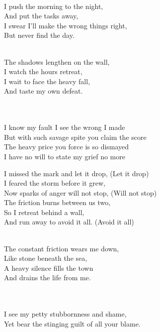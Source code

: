 \begin{lyrics}

\\
I push the morning to the night,\\
And put the tasks away,\\
I swear I’ll make the wrong things right,\\
But never find the day.

\\
The shadows lengthen on the wall,\\
I watch the hours retreat,\\
I wait to face the heavy fall,\\
And taste my own defeat.


\\
\\
I know my fault I see the wrong I made\\
But with such savage spite you claim the score\\
The heavy price you force is so dismayed\\
I have no will to state my grief no more

I missed the mark and let it drop, (Let it drop)\\
I feared the storm before it grew,\\
Now sparks of anger will not stop, (Will not stop)\\
The friction burns between us two,\\
So I retreat behind a wall,\\
And run away to avoid it all. %
(Avoid it all)

\\
The constant friction wears me down,\\
Like stone beneath the sea,\\
A heavy silence fills the town\\
And drains the life from me.


\\
\\
I see my petty stubbornness and shame,\\
Yet bear the stinging guilt of all your blame.


\end{lyrics}
